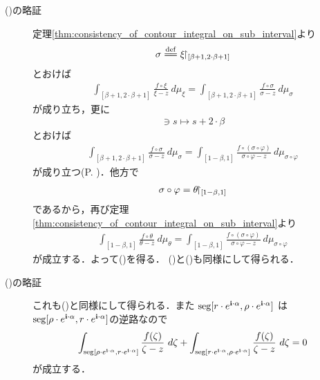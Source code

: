 \begin{description}
		\item[()の略証]	
			定理\ref{thm:consistency_of_contour_integral_on_sub_interval}より
			\begin{align}
				\sigma \defeq \rest{\xi}{[\beta+1,2\cdot\beta+1]}
			\end{align}
			とおけば
			\begin{align}
				\int_{[\beta+1,2\cdot\beta+1]} \frac{f \circ \xi}{\xi - z}\ d\mu_{\xi}
				= \int_{[\beta+1,2\cdot\beta+1]} \frac{f \circ \sigma}{\sigma - z}\ d\mu_{\sigma}
			\end{align}
			が成り立ち，更に
			\begin{align}
				[0,1] \ni s \longmapsto s + 2 \cdot \beta
			\end{align}
			とおけば
			\begin{align}
				\int_{[\beta+1,2\cdot\beta+1]} \frac{f \circ \sigma}{\sigma - z}\ d\mu_{\sigma}
				= \int_{[1-\beta,1]} \frac{f \circ (\sigma \circ \varphi)}{\sigma \circ \varphi - z}\ d\mu_{\sigma \circ \varphi}
			\end{align}
			が成り立つ(P. \pageref{fom:change_of_parameter_interval_complex_contour_integral})．他方で
			\begin{align}
				\sigma \circ \varphi = \theta\hspace{-0.41em}\upharpoonright_{[1-\beta,1]}
			\end{align}
			であるから，再び定理\ref{thm:consistency_of_contour_integral_on_sub_interval}より
			\begin{align}
				\int_{[1-\beta,1]} \frac{f \circ \theta}{\theta - z}\ d\mu_{\theta}
				= \int_{[1-\beta,1]} \frac{f \circ (\sigma \circ \varphi)}{\sigma \circ \varphi - z}\ d\mu_{\sigma \circ \varphi}
			\end{align}
			が成立する．よって()を得る．
			()と()も同様にして得られる．
			
		\item[()の略証]
			これも()と同様にして得られる．また
			$\operatorname{seg}[r \cdot e^{\mathbf{i} \cdot \alpha},\rho \cdot e^{\mathbf{i} \cdot \alpha}]$
			は$\operatorname{seg}[\rho \cdot e^{\mathbf{i} \cdot \alpha},r \cdot e^{\mathbf{i} \cdot \alpha}]$の逆路なので
			\begin{align}
				\int_{\operatorname{seg}[\rho \cdot e^{\mathbf{i} \cdot \alpha},r \cdot e^{\mathbf{i} \cdot \alpha}]} \frac{f(\zeta)}{\zeta - z}\ d\zeta
				+ \int_{\operatorname{seg}[r \cdot e^{\mathbf{i} \cdot \alpha},\rho \cdot e^{\mathbf{i} \cdot \alpha}]} \frac{f(\zeta)}{\zeta - z}\ d\zeta 
				= 0
			\end{align}
			が成立する．
			\QED
	\end{description}
	

